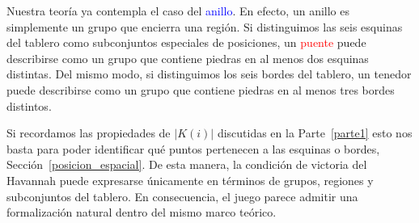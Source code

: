 	Nuestra teoría ya contempla el caso del \textcolor{Blue}{anillo}. En efecto, un anillo es simplemente un grupo que encierra una región. Si distinguimos las seis esquinas del tablero como subconjuntos especiales de posiciones, un \textcolor{Red}{puente} puede describirse como un grupo que contiene piedras en al menos dos esquinas distintas. Del mismo modo, si distinguimos los seis bordes del tablero, un \textcolor{OliveGreen}{tenedor} puede describirse como un grupo que contiene piedras en al menos tres bordes distintos.
	
	Si recordamos las propiedades de $|K(i)|$ discutidas en la Parte~\ref{parte1} esto nos basta para poder identificar qué puntos pertenecen a las esquinas o bordes, Sección~\ref{posicion_espacial}. De esta manera, la condición de victoria del Havannah puede expresarse únicamente en términos de grupos, regiones y subconjuntos del tablero. En consecuencia, el juego parece admitir una formalización natural dentro del mismo marco teórico.
